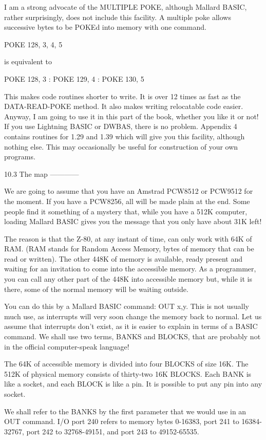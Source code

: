 I  am a strong advocate of the MULTIPLE POKE, although Mallard  BASIC,  rather 
surprisingly,  does  not  include  this  facility.  A  multiple  poke   allows 
successive bytes to be POKEd into memory with one command.

        POKE 128, 3, 4, 5

is equivalent to

        POKE 128, 3 : POKE 129, 4 : POKE 130, 5

This makes code routines shorter to write. It is over 12 times as fast as  the 
DATA-READ-POKE method. It also makes writing relocatable code easier.  Anyway, 
I am going to use it in this part of the book, whether you like it or not!  If 
you  use  Lightning BASIC or DWBAS, there is no problem. Appendix  4  contains 
routines for 1.29 and 1.39 which will give you this facility, although nothing 
else. This may occasionally be useful for construction of your own programs.


10.3 The map
------------

We  are  going to assume that you have an Amstrad PCW8512 or PCW9512  for  the 
moment. If you have a PCW8256, all will be made plain at the end. Some  people 
find  it something of a mystery that, while you have a 512K computer,  loading 
Mallard BASIC gives you the message that you only have about 31K left!

The reason is that the Z-80, at any instant of time, can only work with 64K of 
RAM. (RAM stands for Random Access Memory, bytes of memory that can be read or 
written). The other 448K of memory is available, ready present and waiting for 
an  invitation  to come into the accessible memory. As a programmer,  you  can 
call any other part of the 448K into accessible memory but, while it is there, 
some of the normal memory will be waiting outside.

You can do this by a Mallard BASIC command: OUT x,y. This is not usually  much 
use,  as  interrupts will very soon change the memory back to normal.  Let  us 
assume  that interrupts don't exist, as it is easier to explain in terms of  a 
BASIC command. We shall use two terms, BANKS and BLOCKS, that are probably not 
in the official computer-speak language!

The 64K of accessible memory is divided into four BLOCKS of size 16K. The 512K 
of  physical  memory consists of thirty-two 16K BLOCKS. Each BANK  is  like  a 
socket,  and each BLOCK is like a pin. It is possible to put any pin into  any 
socket.

We shall refer to the BANKS by the first parameter that we would use in an OUT 
command. I/O port 240 refers to memory bytes 0-16383, port 241 to 16384-32767, 
port 242 to 32768-49151, and port 243 to 49152-65535.

